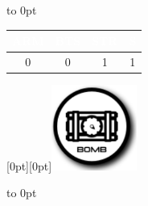 {{\begin{minipage}{6.5in}
{\begin{minipage}{\linewidth-2\fboxsep}
\begin{squishitemize}
{\begin{minipage}[t]{1.85in}
{\begin{minipage}{\linewidth-2\fboxsep}
                \medskip
                \noindent\hbox to 0pt{}\hfill%
                  \begin{tabular}[t]{cccc}
                                 \rowcolor{Black} \textbf{\textcolor{White}{ARM}} & \textbf{\textcolor{White}{BTS}} & \textbf{\textcolor{White}{STR}} & \textbf{\textcolor{White}{S}}\\
                                 \hline
                                 0 & 0 & 1 & 1\\
                               \end{tabular}
                             \end{minipage}}
                         \end{minipage}}\quad\quad%
                       \begin{minipage}[t]{1in}
                       \raisebox{-.95in}[0pt][0pt]{\includegraphics[height=1.1in]{art/icons/bomb}}
                       \end{minipage}%
                       \hfill\hbox to 0pt{}

        
      \end{squishitemize}
  \end{minipage}}
\end{minipage}}}

